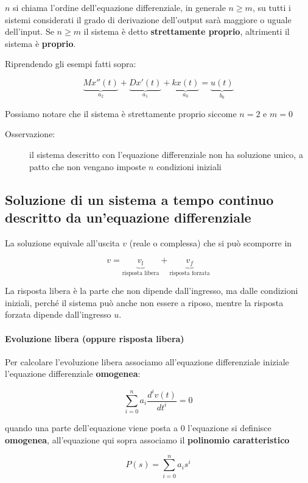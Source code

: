 \documentclass[a4paper, 12pt]{book}
\theoremstyle{plain}
\begin{document}
$n$ si chiama l'ordine dell'equazione differenziale, in generale $n \ge m$, su tutti i sistemi considerati il grado 
di derivazione dell'output sarà maggiore o uguale dell'input. Se $n \ge m$ il sistema è detto \textbf{strettamente proprio}, altrimenti
il sistema è \textbf{proprio}.

Riprendendo gli esempi fatti sopra:

\[
    \underbrace{Mx''(t)}_{a_2} + \underbrace{Dx'(t)}_{a_1} + \underbrace{kx(t)}_{a_0} = \underbrace{u(t)}_{b_0}
\]

Possiamo notare che il sistema è strettamente proprio siccome $n = 2$ e $m = 0$

\begin{description}
    \item[Osservazione:] il sistema descritto con l'equazione differenziale non ha soluzione unico, a patto che non vengano imposte $n$ condizioni iniziali 
\end{description}

\subsection{Soluzione di un sistema a tempo continuo descritto da un'equazione differenziale}

La soluzione equivale all'uscita $v$ (reale o complessa) che si può scomporre in 

\[
    v = \underbrace{v_l}_{\textrm{risposta libera}} + \underbrace{v_f}_{\textrm{risposta forzata}}
\]

La risposta libera è la parte che non dipende dall'ingresso, ma dalle condizioni iniziali, perché il sistema può anche non essere a riposo, 
mentre la risposta forzata dipende dall'ingresso $u$. 

\paragraph{Evoluzione libera (oppure risposta libera)}

Per calcolare l'evoluzione libera associamo all'equazione differenziale iniziale l'equazione differenziale \textbf{omogenea}:

\[
    \sum_{i = 0}^n a_i \frac{d^iv(t)}{dt^i} = 0
\]

quando una parte dell'equazione viene posta a 0 l'equazione si definisce \textbf{omogenea}, all'equazione qui sopra 
associamo il \textbf{polinomio caratteristico}

\[
    P(s) = \sum_{i = 0}^n a_i s^i
\]
\end{document}

